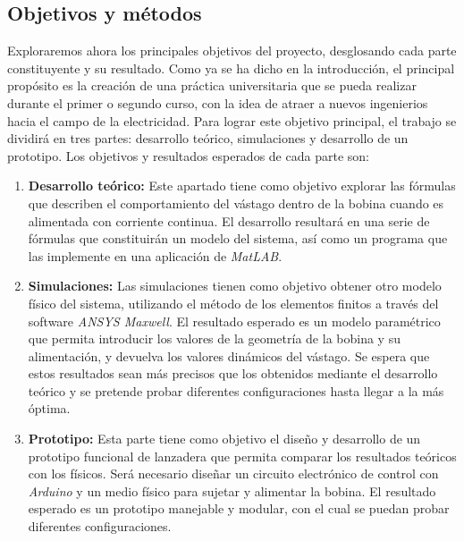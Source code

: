 \newpage

\subsection{Objetivos y métodos}

Exploraremos ahora los principales objetivos del proyecto, desglosando cada parte constituyente y su resultado. Como ya se ha dicho en la introducción, el principal propósito es la creación de una práctica universitaria que se pueda realizar durante el primer o segundo curso, con la idea de atraer a nuevos ingenierios hacia el campo de la electricidad. Para lograr este objetivo principal, el trabajo se dividirá en tres partes: desarrollo teórico, simulaciones y desarrollo de un prototipo. Los objetivos y resultados esperados de cada parte son:

\begin{enumerate}
    \item \textbf{Desarrollo teórico:} Este apartado tiene como objetivo explorar las fórmulas que describen el comportamiento del vástago dentro de la bobina cuando es alimentada con corriente continua. El desarrollo resultará en una serie de fórmulas que constituirán un modelo del sistema, así como un programa que las implemente en una aplicación de \textit{MatLAB\textregistered}.
    \item \textbf{Simulaciones:} Las simulaciones tienen como objetivo obtener otro modelo físico del sistema, utilizando el método de los elementos finitos a través del software \textit{ANSYS Maxwell\textregistered}. El resultado esperado es un modelo paramétrico que permita introducir los valores de la geometría de la bobina y su alimentación, y devuelva los valores dinámicos del vástago. Se espera que estos resultados sean más precisos que los obtenidos mediante el desarrollo teórico y se pretende probar diferentes configuraciones hasta llegar a la más óptima.
    \item \textbf{Prototipo:} Esta parte tiene como objetivo el diseño y desarrollo de un prototipo funcional de lanzadera que permita comparar los resultados teóricos con los físicos. Será necesario diseñar un circuito electrónico de control con \textit{Arduino\textregistered} y un medio físico para sujetar y alimentar la bobina. El resultado esperado es un prototipo manejable y modular, con el cual se puedan probar diferentes configuraciones.
\end{enumerate}